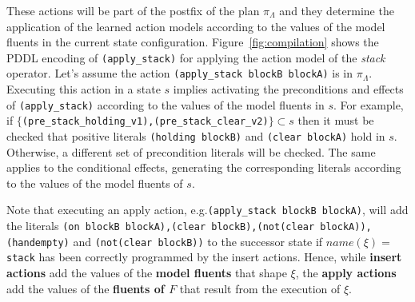 \begin{itemize}
\begin{enumerate}
    These actions will be part of the postfix of the plan $\pi_\Lambda$ and \textcolor[rgb]{1.00,0.00,0.00}{they determine the application of the learned action models according to the values of the model fluents in the current state configuration}. Figure~\ref{fig:compilation} shows the PDDL encoding of {\tt{\small (apply\_stack)}} for applying the action model of the {\em stack} operator. \textcolor[rgb]{1.00,0.00,0.00}{Let's assume the action {\tt{\small (apply\_stack blockB blockA)}} is in $\pi_\Lambda$. Executing this action in a state $s$ implies activating the preconditions and effects of {\tt{\small (apply\_stack)}} according to the values of the model fluents in $s$. For example, if  $\{${\tt{\small (pre\_stack\_holding\_v1),(pre\_stack\_clear\_v2)}}$\} \subset s$ then it must be checked that positive literals {\tt{\small (holding blockB)}} and {\tt{\small (clear blockA)}} hold in $s$. Otherwise, a different set of precondition literals will be checked. The same applies to the conditional effects, generating the corresponding literals according to the values of the model fluents of $s$.}

\textcolor[rgb]{1.00,0.00,0.00}{    Note that executing an apply action, e.g.{\tt{\small (apply\_stack blockB blockA)}}, will add the literals {\tt{\small (on blockB blockA),(clear blockB),(not(clear blockA)),(handempty)}} and {\tt{\small(not(clear blockB))}} to the successor state if $name(\xi)=${\tt{\small stack}} has been correctly programmed by the insert actions. Hence, while \textbf{insert actions} add the values of the \textbf{model fluents} that shape $\xi$, the \textbf{apply actions} add the values of the \textbf{fluents of $F$} that result from the execution of $\xi$.}



\end{enumerate}
\end{itemize}
